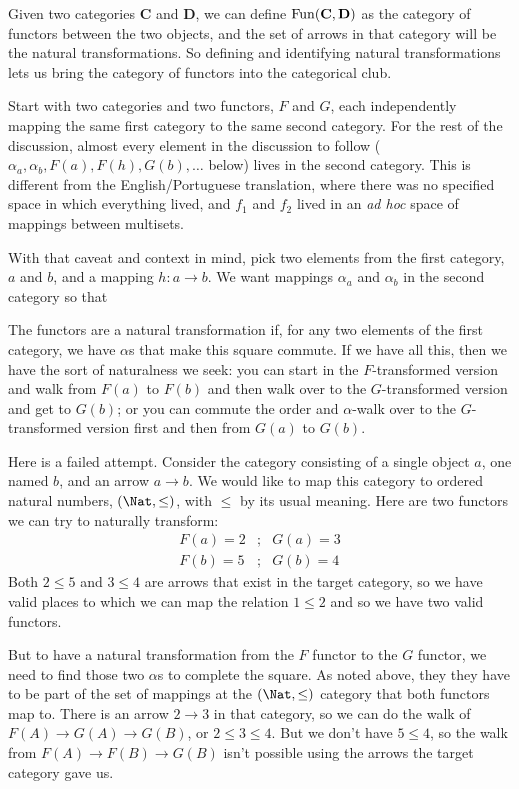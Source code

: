 \documentclass[11pt]{article}
\begin{document}
Given two categories {\bf C} and {\bf D}, we can define ${\rm Fun}({\bf C}, {\bf D})$ as
the category of functors between the two objects, and the set of arrows in that category
will be the natural transformations. So defining and identifying natural
transformations lets us bring the category of functors into the categorical club.

Start with two categories and two functors, $F$ and $G$, each independently mapping the same first
category to the same second category. For the rest of the discussion, almost every element in the discussion
to follow ($\alpha_a, \alpha_b, F(a), F(h), G(b), \dots$ below) lives in the second category.
This is different from the English/Portuguese translation, where there was no specified
space in which everything lived, and $f_1$ and $f_2$ lived in an {\em ad hoc} space of
mappings between multisets.

With that caveat and context in mind, pick two elements from the first category, $a$
and $b$, and a mapping $h:a\to b$.  We want mappings $\alpha_a$ and $\alpha_b$ in the
second category so that


The functors are a natural transformation if, for any two elements of the first category,
we have $\alpha$s that make this square commute.
 If we have all this, then we have the sort of naturalness we seek: you can
start in the $F$-transformed version and walk from $F(a)$ to $F(b)$ and then walk over to
the $G$-transformed version and get to $G(b)$; or you can commute the order and
$\alpha$-walk over to the $G$-transformed version first and then from $G(a)$ to $G(b)$.

Here is a failed attempt.
Consider the category consisting of a single object $a$, one named $b$, and an arrow $a\to
b$. We would like to map this category to ordered natural numbers, $(\Nat, \leq)$, with
$\leq$ by its usual meaning. Here are two functors we can try to naturally transform:
\begin{eqnarray*}
    F(a) = 2 &;& G(a) = 3\\
    F(b) = 5 &;& G(b) = 4
\end{eqnarray*} 
Both $2 \leq 5$ and $3 \leq 4$ are arrows that exist in the target category, so we have
valid places to which we can map the relation $1\leq 2$ and so we have two valid functors.

But to have a natural transformation from the $F$ functor to the $G$ functor, we need
to find those two $\alpha$s to complete the square. As noted above, they
they have to be part of the set of mappings at the $(\Nat, \leq)$ category that both
functors map to. There is an arrow $2\to 3$ in that category, so we can do the walk
of $F(A) \to G(A) \to G(B)$, or $2 \leq 3 \leq 4$.  But we don't have $5\leq 4$,
so the walk from $F(A)\to F(B) \to G(B)$ isn't possible using the arrows the target
category gave us.
\end{document}
